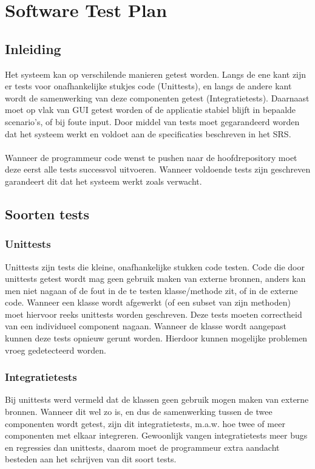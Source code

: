 \chapter{Software Test Plan}
\section{Inleiding}
Het systeem kan op verschilende manieren getest worden. 
Langs de ene kant zijn er tests voor onafhankelijke stukjes code (Unittests), en langs de andere kant wordt de samenwerking van deze componenten getest (Integratietests). 
Daarnaast moet op vlak van GUI getest worden of de applicatie stabiel blijft in bepaalde scenario's, of bij foute input. 
Door middel van tests moet gegarandeerd worden dat het systeem werkt en voldoet aan de specificaties beschreven in het SRS\cite{srs}. 
\\
\\
Wanneer de programmeur code wenst te pushen naar de hoofdrepository moet deze eerst alle tests successvol uitvoeren. 
Wanneer voldoende tests zijn geschreven garandeert dit dat het systeem werkt zoals verwacht.

\section{Soorten tests}

\subsection{Unittests}
Unittests zijn tests die kleine, onafhankelijke stukken code testen. Code die door unittests getest wordt mag geen gebruik maken van externe bronnen, anders kan men niet nagaan of de fout in de te testen klasse/methode zit, of in de externe code.
Wanneer een klasse wordt afgewerkt (of een subset van zijn methoden) moet hiervoor reeks unittests worden geschreven. 
Deze tests moeten correctheid van een individueel component nagaan. 
Wanneer de klasse wordt aangepast kunnen deze tests opnieuw gerunt worden. Hierdoor kunnen mogelijke problemen vroeg gedetecteerd worden.

\subsection{Integratietests}
Bij unittests werd vermeld dat de klassen geen gebruik mogen maken van externe bronnen. Wanneer dit wel zo is, en dus de samenwerking tussen de twee componenten wordt getest, zijn dit integratietests, m.a.w. hoe twee of meer componenten met elkaar integreren. 
Gewoonlijk vangen integratietests meer bugs en regressies dan unittests, daarom moet de programmeur extra aandacht besteden aan het schrijven van dit soort tests.

